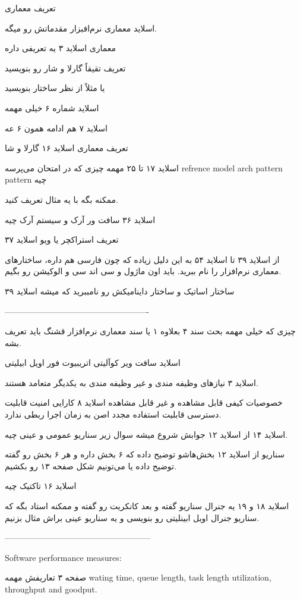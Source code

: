 تعریف معماری

اسلاید معماری نرم‌افبزار مقدماتش رو میگه.

معماری اسلاید ۳ یه تعریفی داره

تعریف تقیقاً گارلا و شار رو بنویسید

یا مثلاً از نظر ساختار بنویسید

اسلاید شماره ۶ خیلی مهمه

اسلاید ۷ هم ادامه همون ۶ عه

تعریف معماری اسلاید ۱۶ گارلا و شا

اسلاید ۱۷ تا ۲۵ مهمه چیزی که در امتحان می‌پرسه
refrence model 
arch pattern
pattern چیه

ممکنه بگه با یه مثال تعریف کنید.

اسلاید ۳۶ سافت ور آرک و سیستم آرک چیه

تعریف استراکچر یا ویو اسلاید ۳۷

از اسلاید ۳۹ تا اسلاید ۵۴ به این دلیل زیاده که چون فارسی هم داره، ساختار‌های
معماری نرم‌افزار را نام ببرید. باید اون ماژول و سی اند سی و الوکیشن رو بگیم.

ساختار اساتیک و ساختار داینامیکش رو نامببرید که میشه اسلاید ۳۹

----------------------------------------------------

چیزی که خیلی مهمه بحث سند ۴ بعلاوه ۱ یا سند معماری نرم‌افزار قشنگ باید تعریف بشه.

اسلاید سافت ویر کوآلیتی اتریبیوت فور اویل ابیلیتی

اسلاید ۳ نیاز‌های وظیفه مندی و غیر وظیفه مندی به یکدیگر متعامد هستند.

خصوصیات کیفی قابل مشاهده و غیر قابل مشاهده اسلاید ۸
کارایی امنیت قابلیت دسترسی
قابلیت استفاده مجدد اصن به زمان اجرا ربطی ندارد.

اسلاید ۱۴ از اسلاید ۱۲ جوابش شروع میشه سوال زیر
سناریو عمومی و عینی چیه.

سناریو از اسلاید ۱۲ بخش‌هاشو توضیح داده که ۶ بخش داره و هر ۶ بخش رو گفته توضیح
داده یا می‌تونیم شکل صفحه ۱۳ رو بکشیم.

اسلاید ۱۶ تاکتیک چیه

اسلاید ۱۸ و ۱۹ یه جنرال سناریو گفته و بعد کانکریت رو گفته و ممکنه استاد بگه که
سناریو جنرال اویل ابینلیتی رو بنویسی و یه سناریو عینی براش مثال بزنیم.

-----------------------------------------------------

Software performance measures:

صفحه ۳ تعاریفش مهمه wating time, queue length, task length utilization,
throughput and goodput.

